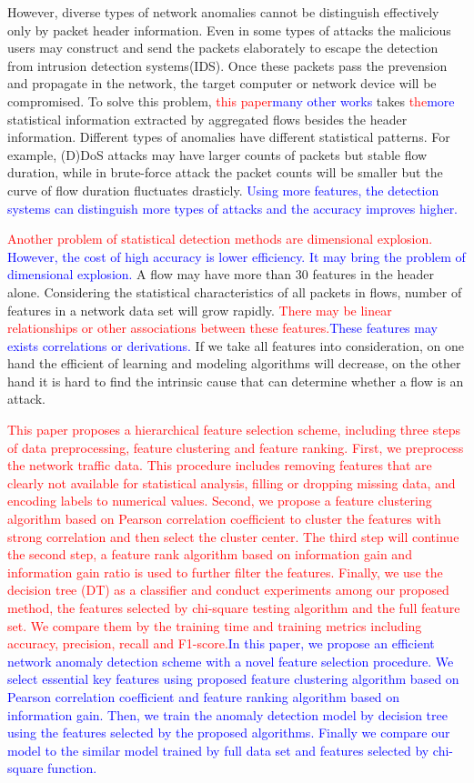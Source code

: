 \documentclass{ieeeaccess}
\theoremstyle{definition}
\newcommand{\change}[2]{\textcolor{red}{#1}\textcolor{blue}{#2}}
\begin{document}
However, diverse types of network anomalies cannot be distinguish effectively only by packet header information. Even in some types of attacks the malicious users may construct and send the packets elaborately to escape the detection from intrusion detection systems(IDS). Once these packets pass the prevension and propagate in the network, the target computer or network device will be compromised.
To solve this problem, \change{this paper}{many other works} takes \change{the}{more} statistical information extracted by aggregated flows besides the header information. Different types of anomalies have different statistical patterns. For example, (D)DoS attacks may have larger counts of packets but stable flow duration, while in brute-force attack the packet counts will be smaller but the curve of flow duration fluctuates drasticly. \change{}{Using more features, the detection systems can distinguish more types of attacks and the accuracy improves higher.}

\change{Another problem of statistical detection methods are dimensional explosion. }{However, the cost of high accuracy is lower efficiency. It may bring the problem of dimensional explosion.} A flow may have more than 30 features in the header alone. Considering the statistical characteristics of all packets in flows, number of features in a network data set will grow rapidly. \change{There may be linear relationships or other associations between these features.}{These features may exists correlations or derivations.} If we take all features into consideration, on one hand the efficient of learning and modeling algorithms will decrease, on the other hand it is hard to find the intrinsic cause that can determine whether a flow is an attack.

\change{This paper proposes a hierarchical feature selection scheme, including three steps of data preprocessing, feature clustering and feature ranking. First, we preprocess the network traffic data. This procedure includes removing features that are clearly not available for statistical analysis, filling or dropping missing data, and encoding labels to numerical values. Second, we propose a feature clustering algorithm based on Pearson correlation coefficient to cluster the features with strong correlation and then select the cluster center. The third step will continue the second step, a feature rank algorithm based on information gain and information gain ratio is used to further filter the features. Finally, we use the decision tree (DT) as a classifier and conduct experiments among our proposed method, the features selected by chi-square testing algorithm and the full feature set. We compare them by the training time and training metrics including accuracy, precision, recall and F1-score.}{In this paper, we propose an efficient network anomaly detection scheme with a novel feature selection procedure. We select essential key features using proposed feature clustering algorithm based on Pearson correlation coefficient and feature ranking algorithm based on information gain. Then, we train the anomaly detection model by decision tree using the features selected by the proposed algorithms. Finally we compare our model to the similar model trained by full data set and features selected by chi-square function.} 
\end{document}
